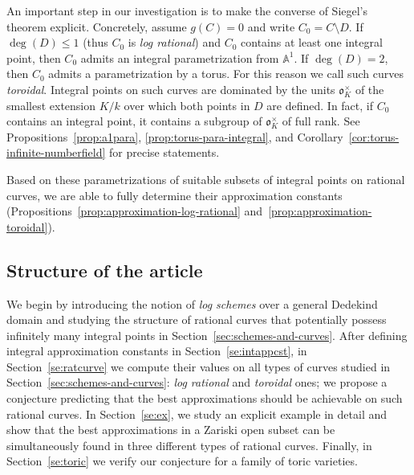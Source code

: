 \documentclass[a4paper, twoside, 11pt]{amsart}
\theoremstyle{definition}
\newcommand{\fo}{\mathfrak{o}}
\newcommand{\dA}{\mathbb{A}}
\begin{document}
An important step in our investigation is to make the converse of Siegel's theorem explicit. Concretely, assume $g(C)=0$ and write $C_0=C\setminus D$. If $\deg(D)\le 1$ (thus $C_0$ is \emph{log rational}) and $C_0$ contains at least one integral point, then $C_0$ admits an integral parametrization from $\dA^1$. If $\deg(D)=2$, then $C_0$ admits a parametrization by a torus. For this reason we call such curves \emph{toroidal}. Integral points on such curves are dominated by the units $\fo_K^\times$ of the smallest extension $K/k$ over which both points in $D$ are defined. In fact, if $C_0$ contains an integral point, it contains a subgroup of $\fo_K^\times$ of full rank. See Propositions~\ref{prop:a1para}, \ref{prop:torus-para-integral}, and Corollary~\ref{cor:torus-infinite-numberfield} for precise statements.

Based on these parametrizations of suitable subsets of integral points on rational curves, we are able to fully determine their approximation constants (Propositions~\ref{prop:approximation-log-rational} and~\ref{prop:approximation-toroidal}).


\subsection{Structure of the article} We begin by introducing the notion of \emph{log schemes} over a general Dedekind domain and studying the structure of rational curves that potentially possess infinitely many integral points in Section~\ref{sec:schemes-and-curves}.
After defining integral approximation constants in Section~\ref{se:intappcst}, in Section~\ref{se:ratcurve} we compute their values on all types of curves studied in Section~\ref{sec:schemes-and-curves}: \emph{log rational} and \emph{toroidal} ones; we propose a conjecture predicting that the best approximations should be achievable on such rational curves.
In Section~\ref{se:ex}, we study an explicit example in detail and show that the best approximations in a Zariski open subset can be simultaneously found in three different types of rational curves. Finally, in Section~\ref{se:toric} we verify our conjecture for a family of toric varieties. 
\end{document}
